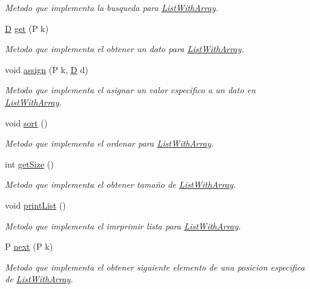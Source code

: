 \begin{DoxyCompactItemize}
\begin{DoxyCompactList}\small\item\em Metodo que implementa la busqueda para \hyperlink{class_list_with_array}{List\+With\+Array}. \end{DoxyCompactList}\item 
\hyperlink{gwp_2main_8cpp_af316c33cc298530f245e8b55330e86b5}{D} \hyperlink{class_list_with_array_a20cfc82811967bc2a77a6e43b9cebb46}{get} (P k)
\begin{DoxyCompactList}\small\item\em Metodo que implementa el obtener un dato para \hyperlink{class_list_with_array}{List\+With\+Array}. \end{DoxyCompactList}\item 
void \hyperlink{class_list_with_array_a9dd1fd2337c6c8d437de71aae0e816c8}{assign} (P k, \hyperlink{gwp_2main_8cpp_af316c33cc298530f245e8b55330e86b5}{D} d)
\begin{DoxyCompactList}\small\item\em Metodo que implementa el asignar un valor especifico a un dato en \hyperlink{class_list_with_array}{List\+With\+Array}. \end{DoxyCompactList}\item 
void \hyperlink{class_list_with_array_a1a0ec4ab4a8fcb1a20568445ad892c9a}{sort} ()
\begin{DoxyCompactList}\small\item\em Metodo que implementa el ordenar para \hyperlink{class_list_with_array}{List\+With\+Array}. \end{DoxyCompactList}\item 
int \hyperlink{class_list_with_array_ae7a071bcdde9ddbf4c40a716f5a09434}{get\+Size} ()
\begin{DoxyCompactList}\small\item\em Metodo que implementa el obtener tamaño de \hyperlink{class_list_with_array}{List\+With\+Array}. \end{DoxyCompactList}\item 
void \hyperlink{class_list_with_array_a515ea38cb40ba7b0c9df98825b2dd270}{print\+List} ()
\begin{DoxyCompactList}\small\item\em Metodo que implementa el imrprimir lista para \hyperlink{class_list_with_array}{List\+With\+Array}. \end{DoxyCompactList}\item 
P \hyperlink{class_list_with_array_a125811011abb77c1b11e5150f4524fb1}{next} (P k)
\begin{DoxyCompactList}\small\item\em Metodo que implementa el obtener siguiente elemento de una posicion especifica de \hyperlink{class_list_with_array}{List\+With\+Array}. \end{DoxyCompactList}\item 

\end{DoxyCompactItemize}
